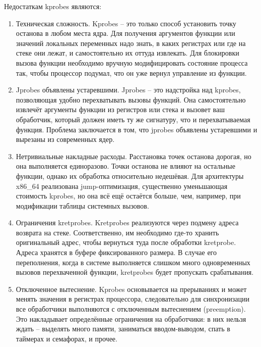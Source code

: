 		Недостаткам kprobes являются:
		\begin{enumerate}
			\item Техническая сложность. 
				Kprobes -- это только способ установить точку останова в любом места ядра. 
				Для получения аргументов функции или значений локальных переменных надо знать,
				в каких регистрах или где на стеке они лежат, и самостоятельно их оттуда извлекать.
				Для блокировки вызова функции необходимо вручную модифицировать состояние процесса так,
				чтобы процессор подумал, что он уже вернул управление из функции.

			\item Jprobes объявлены устаревшими. 
				Jprobes -- это надстройка над kprobes, позволяющая удобно перехватывать вызовы функций.
				Она самостоятельно извлечёт аргументы функции из регистров или стека и вызовет ваш обработчик,
				который должен иметь ту же сигнатуру, что и перехватываемая функция. 
				Проблема заключается в том, что jprobes объявлены устаревшими и вырезаны из современных ядер.

			\item Нетривиальные накладные расходы. 
				Расстановка точек останова дорогая, но она выполняется единоразово. 
				Точки останова не влияют на остальные функции, однако их обработка относительно недешёвая.
				Для архитектуры x86\_64 реализована jump-оптимизация, существенно уменьшающая стоимость kprobes,
				но она всё ещё остаётся больше, чем, например, при модификации таблицы системных вызовов.

			\item Ограничения kretprobes. 
				Kretprobes реализуются через подмену адреса возврата на стеке. 
				Соответственно, им необходимо где-то хранить оригинальный адрес,
				чтобы вернуться туда после обработки kretprobe. 
				Адреса хранятся в буфере фиксированного размера. 
				В случае его переполнения, когда в системе выполняется слишком много одновременных вызовов перехваченной функции, 
				kretprobes будет пропускать срабатывания.

			\item Отключенное вытеснение. 
				Kprobes основывается на прерываниях и может менять значения в регистрах процессора,
				следовательно для синхронизации все обработчики выполняются с отключенным вытеснением (preemption).
				Это накладывает определённые ограничения на обработчики: 
				в них нельзя ждать -- выделять много памяти, заниматься вводом-выводом, 
				спать в таймерах и семафорах, и прочее.
		\end{enumerate}

